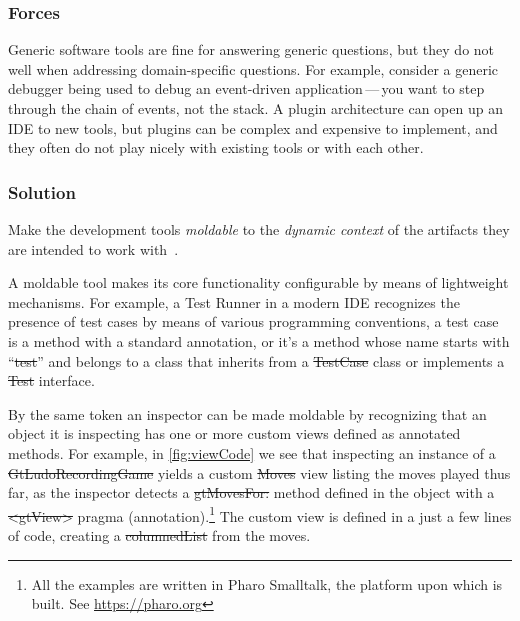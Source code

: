 \documentclass[sigconf]{acmart}
\renewcommand{\nbc}[3]{} %
\newcommand\tk[1]{\nbc{Timo}{#1}{cyan}}
\newcommand\kh[1]{\nbc{Konrad}{#1}{violet}}
\newcommand\eog[1]{\nbc{Edward}{#1}{purple}}
\newcommand{\GT}{\lst{GT}\xspace} %
\begin{document}
\subsubsection*{Forces}
Generic software tools are fine for answering generic questions, but they do not  well when addressing domain-specific questions.
For example, consider a generic debugger being used to debug an event-driven application\,---\,you want to step through the chain of events, not the stack.
A plugin architecture can open up an IDE to new tools, but plugins can be complex and expensive to implement, and they often do not play nicely with existing tools or with each other.


\tk{We call it "the preplanning problem" when discussing frameworks + plug-ins as an implementation option for software product lines. You need to identify all the hot spots for potential extensions in advance, define appropriate extension points, define interfaces which are not too broad and not too narrow, etc.}

\subsubsection*{Solution}
Make the development tools \emph{moldable} to the \emph{dynamic context} of the artifacts they are intended to work with~\cite{Chis17a}.

A moldable tool makes its core functionality configurable by means of lightweight mechanisms.
For example, a Test Runner in a modern IDE recognizes the presence of test cases by means of various programming conventions, \ie a test case is a method with a standard annotation, or it's a method whose name starts with ``\st{test}'' and belongs to a class that inherits from a \st{TestCase} class or implements a \st{Test} interface.

By the same token an inspector can be made moldable by recognizing that an object it is inspecting has one or more custom views defined as annotated methods.
For example, in \autoref{fig:viewCode} we see that inspecting an instance of a \st{GtLudoRecordingGame} yields a custom \st{Moves} view listing the moves played thus far, as the inspector detects a \st{gtMovesFor:} method defined in the object with a \st{<gtView>} pragma (\ie annotation).\footnote{All the examples are written in Pharo Smalltalk, the platform upon which \GT is built. See \url{https://pharo.org}}
The custom view is defined in a just a few lines of code, creating a \st{columnedList} from the moves.
\end{document}
